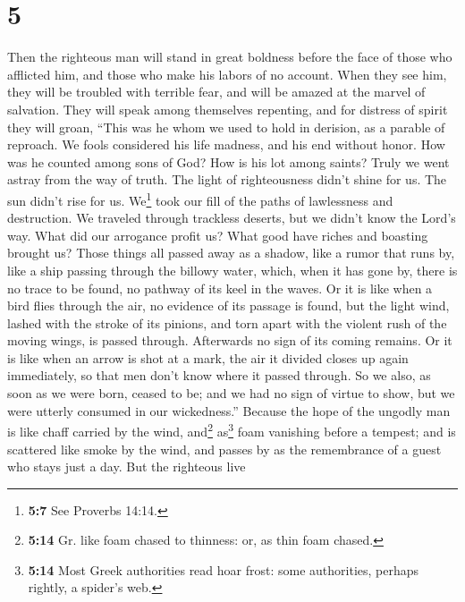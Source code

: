 \hypertarget{section-4}{%
\section{5}\label{section-4}}

 Then the righteous man will stand in great boldness
before the face of those who afflicted him, and those who make his
labors of no account.  When they see him, they will be
troubled with terrible fear, and will be amazed at the marvel of
salvation.  They will speak among themselves repenting,
and for distress of spirit they will groan, ``This was he whom we used
to hold in derision, as a parable of reproach.  We fools
considered his life madness, and his end without honor. 
How was he counted among sons of God? How is his lot among saints?
 Truly we went astray from the way of truth. The light of
righteousness didn't shine for us. The sun didn't rise for us.
 We\footnote{\textbf{5:7} See Proverbs 14:14.} took our
fill of the paths of lawlessness and destruction. We traveled through
trackless deserts, but we didn't know the Lord's way. 
What did our arrogance profit us? What good have riches and boasting
brought us?  Those things all passed away as a shadow,
like a rumor that runs by,  like a ship passing through
the billowy water, which, when it has gone by, there is no trace to be
found, no pathway of its keel in the waves.  Or it is
like when a bird flies through the air, no evidence of its passage is
found, but the light wind, lashed with the stroke of its pinions, and
torn apart with the violent rush of the moving wings, is passed through.
Afterwards no sign of its coming remains.  Or it is like
when an arrow is shot at a mark, the air it divided closes up again
immediately, so that men don't know where it passed through.
 So we also, as soon as we were born, ceased to be; and
we had no sign of virtue to show, but we were utterly consumed in our
wickedness.''  Because the hope of the ungodly man is
like chaff carried by the wind, and\footnote{\textbf{5:14} Gr. like foam
  chased to thinness: or, as thin foam chased.} as\footnote{\textbf{5:14}
  Most Greek authorities read hoar frost: some authorities, perhaps
  rightly, a spider's web.} foam vanishing before a tempest; and is
scattered like smoke by the wind, and passes by as the remembrance of a
guest who stays just a day.  But the righteous live
